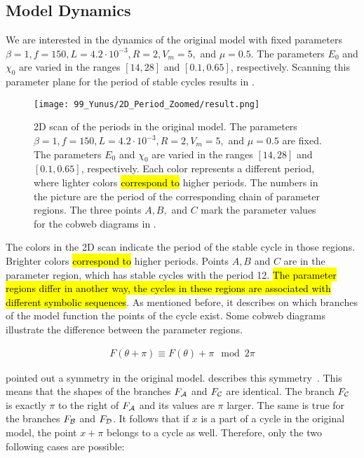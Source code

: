 \subsection{Model Dynamics}
\label{sec:state.og.dynamics}

We are interested in the dynamics of the original model with fixed parameters $\beta = 1, f = 150, L = 4.2 \cdot 10^{-3}, R = 2, V_m = 5,$ and $\mu = 0.5$.
The parameters $E_0$ and $\chi_0$ are varied in the ranges $[14, 28]$ and $[0.1, 0.65]$, respectively.
Scanning this parameter plane for the period of stable cycles results in .

\begin{figure}
	\centering
	\texttt{[image: 99\_Yunus/2D\_Period\_Zoomed/result.png]}
	\caption[2D scan of the periods in the original model]{
		2D scan of the periods in the original model.
		The parameters $\beta = 1, f = 150, L = 4.2 \cdot 10^{-3}, R = 2, V_m = 5,$ and $\mu = 0.5$ are fixed.
		The parameters $E_0$ and $\chi_0$ are varied in the ranges $[14, 28]$ and $[0.1, 0.65]$, respectively.
		Each color represents a different period, where lighter colors \hl{correspond to} higher periods.
		The numbers in the picture are the period of the corresponding chain of parameter regions.
		The three points $A, B,$ and $C$ mark the parameter values for the cobweb diagrams in .
	}
	\label{fig:state.og.dynamics.period}
\end{figure}

The colors in the 2D scan  indicate the period of the stable cycle in those regions.
Brighter colors \hl{correspond to} higher periods.
Points $A, B$ and $C$ are in the parameter region, which has stable cycles with the period 12.
\hl{The parameter regions differ in another way, the cycles in these regions are associated with different symbolic sequences}.
As mentioned before, it describes on which branches of the model function the points of the cycle exist.
Some cobweb diagrams illustrate the difference between the parameter regions.

\begin{align}
	F(\theta + \pi) \equiv F(\theta) + \pi \mod 2\pi \label{equ:state.og.sym}
\end{align}

 pointed out a symmetry in the original model.
 describes this symmetry~\cite{akyuz2022}.
This means that the shapes of the branches $F_{\mathcal{A}}$ and $F_{\mathcal{C}}$ are identical.
The branch $F_{\mathcal{C}}$ is exactly $\pi$ to the right of $F_{\mathcal{A}}$ and its values are $\pi$ larger.
The same is true for the branches $F_{\mathcal{B}}$ and $F_{\mathcal{D}}$.
It follows that if $x$ is a part of a cycle in the original model, the point $x + \pi$ belongs to a cycle as well.
Therefore, only the two following cases are possible:

